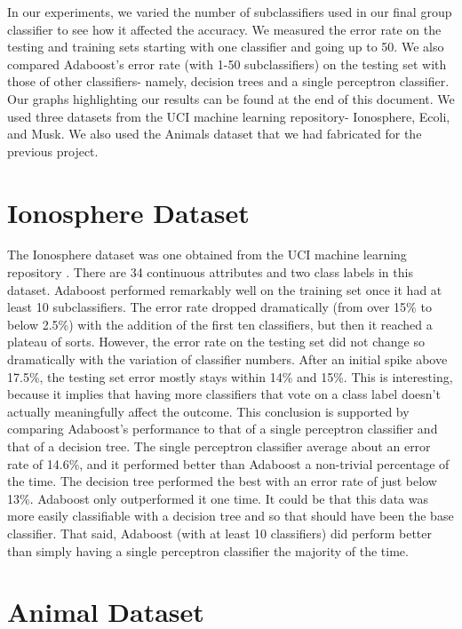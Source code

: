 \documentclass{article}
\begin{document}
In our experiments, we varied the number of subclassifiers used in our final group classifier to see how it affected the accuracy. We measured the error rate on the testing and training sets starting with one classifier and going up to 50. We also compared Adaboost's error rate (with 1-50 subclassifiers) on the testing set with those of other classifiers- namely, decision trees and a single perceptron classifier. Our graphs highlighting our results can be found at the end of this document. We used three datasets from the UCI machine learning repository- Ionosphere, Ecoli, and Musk. We also used the Animals dataset that we had fabricated for the previous project.

\section{Ionosphere Dataset}

The Ionosphere dataset was one obtained from the UCI machine learning repository \cite{ionosphere}. There are 34 continuous attributes and two class labels in this dataset. Adaboost performed remarkably well on the training set once it had at least 10 subclassifiers. The error rate dropped dramatically (from over 15\% to below 2.5\%) with the addition of the first ten classifiers, but then it reached a plateau of sorts. However, the error rate on the testing set did not change so dramatically with the variation of classifier numbers. After an initial spike above 17.5\%, the testing set error mostly stays within 14\% and 15\%. This is interesting, because it implies that having more classifiers that vote on a class label doesn't actually meaningfully affect the outcome. This conclusion is supported by comparing Adaboost's performance to that of a single perceptron classifier and that of a decision tree. The single perceptron classifier average about an error rate of 14.6\%, and it performed better than Adaboost a non-trivial percentage of the time. The decision tree performed the best with an error rate of just below 13\%. Adaboost only outperformed it one time. It could be that this data was more easily classifiable with a decision tree and so that should have been the base classifier. That said, Adaboost (with at least 10 classifiers) did perform better than simply having a single perceptron classifier the majority of the time.

\section{Animal Dataset}
\end{document}
